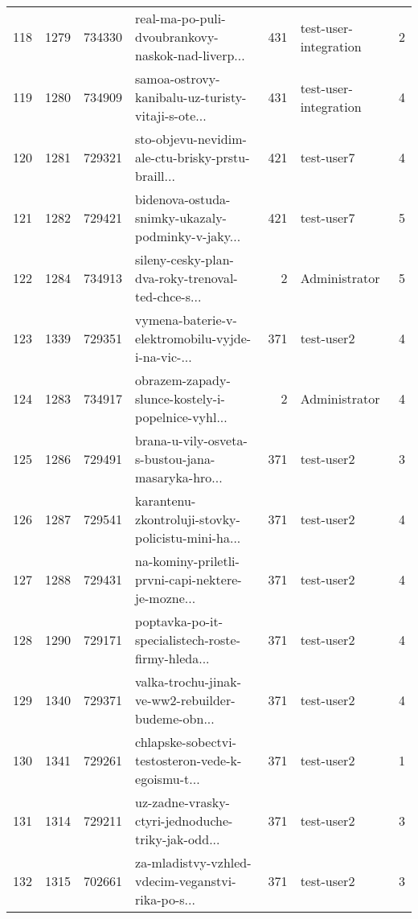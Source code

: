 \begin{tabular}{lrrlrlr}
118  &       1279 &   734330 &  real-ma-po-puli-dvoubrankovy-naskok-nad-liverp... &      431 &        test-user-integration &               2 \\
119  &       1280 &   734909 &  samoa-ostrovy-kanibalu-uz-turisty-vitaji-s-ote... &      431 &        test-user-integration &               4 \\
120  &       1281 &   729321 &  sto-objevu-nevidim-ale-ctu-brisky-prstu-braill... &      421 &                   test-user7 &               4 \\
121  &       1282 &   729421 &  bidenova-ostuda-snimky-ukazaly-podminky-v-jaky... &      421 &                   test-user7 &               5 \\
122  &       1284 &   734913 &  sileny-cesky-plan-dva-roky-trenoval-ted-chce-s... &        2 &                Administrator &               5 \\
123  &       1339 &   729351 &  vymena-baterie-v-elektromobilu-vyjde-i-na-vic-... &      371 &                   test-user2 &               4 \\
124  &       1283 &   734917 &  obrazem-zapady-slunce-kostely-i-popelnice-vyhl... &        2 &                Administrator &               4 \\
125  &       1286 &   729491 &  brana-u-vily-osveta-s-bustou-jana-masaryka-hro... &      371 &                   test-user2 &               3 \\
126  &       1287 &   729541 &  karantenu-zkontroluji-stovky-policistu-mini-ha... &      371 &                   test-user2 &               4 \\
127  &       1288 &   729431 &  na-kominy-priletli-prvni-capi-nektere-je-mozne... &      371 &                   test-user2 &               4 \\
128  &       1290 &   729171 &  poptavka-po-it-specialistech-roste-firmy-hleda... &      371 &                   test-user2 &               4 \\
129  &       1340 &   729371 &  valka-trochu-jinak-ve-ww2-rebuilder-budeme-obn... &      371 &                   test-user2 &               4 \\
130  &       1341 &   729261 &  chlapske-sobectvi-testosteron-vede-k-egoismu-t... &      371 &                   test-user2 &               1 \\
131  &       1314 &   729211 &  uz-zadne-vrasky-ctyri-jednoduche-triky-jak-odd... &      371 &                   test-user2 &               3 \\
132  &       1315 &   702661 &  za-mladistvy-vzhled-vdecim-veganstvi-rika-po-s... &      371 &                   test-user2 &               3 \\

\end{tabular}
